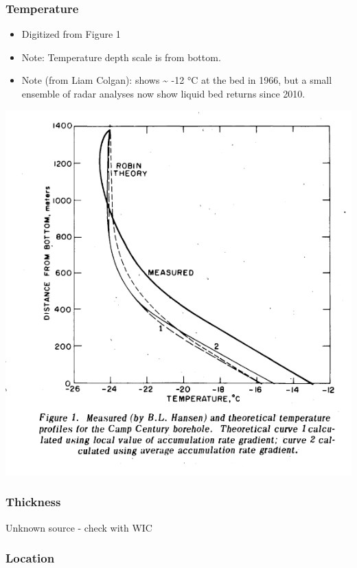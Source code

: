 \documentclass[article,a4paper,times,11pt,twoside]{article}
\begin{document}
\subsubsection{Temperature}
\label{sec:org1be3116}

\begin{itemize}
\item Digitized from \textcite{weertman_1968} Figure 1
\item Note: Temperature depth scale is from bottom.
\item Note (from Liam Colgan): \textcite{weertman_1968} shows \textasciitilde{} -12 °C at the bed in 1966, but a small ensemble of radar analyses now show liquid bed returns since 2010.
\end{itemize}


\begin{center}
\includegraphics[width=.9\linewidth]{camp_century/weertman_1968_fig1.png}
\end{center}

\subsubsection{Thickness}
\label{sec:org7238492}

Unknown source - check with WIC

\subsubsection{Location}
\label{sec:org2fee90b}
\end{document}
